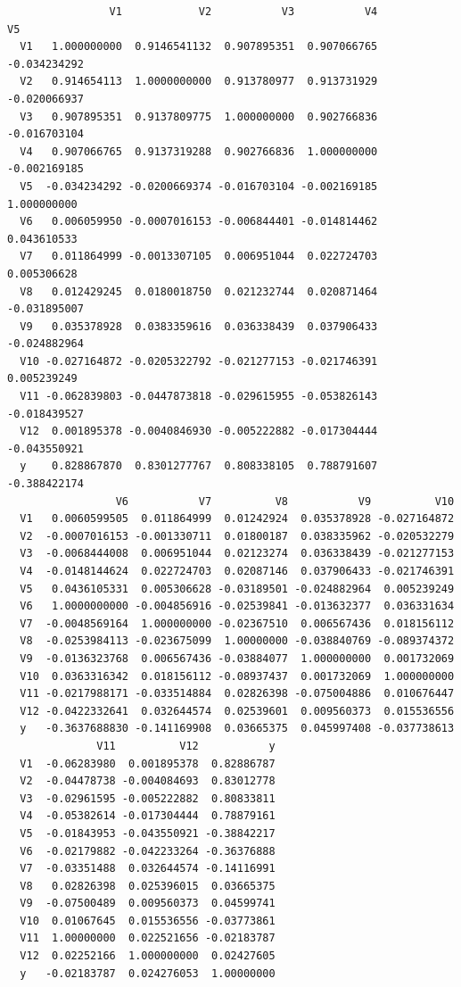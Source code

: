 \documentclass[12pt,twoside]{reedthesis}
\begin{document}
  \begin{verbatim}
                V1            V2           V3           V4           V5
  V1   1.000000000  0.9146541132  0.907895351  0.907066765 -0.034234292
  V2   0.914654113  1.0000000000  0.913780977  0.913731929 -0.020066937
  V3   0.907895351  0.9137809775  1.000000000  0.902766836 -0.016703104
  V4   0.907066765  0.9137319288  0.902766836  1.000000000 -0.002169185
  V5  -0.034234292 -0.0200669374 -0.016703104 -0.002169185  1.000000000
  V6   0.006059950 -0.0007016153 -0.006844401 -0.014814462  0.043610533
  V7   0.011864999 -0.0013307105  0.006951044  0.022724703  0.005306628
  V8   0.012429245  0.0180018750  0.021232744  0.020871464 -0.031895007
  V9   0.035378928  0.0383359616  0.036338439  0.037906433 -0.024882964
  V10 -0.027164872 -0.0205322792 -0.021277153 -0.021746391  0.005239249
  V11 -0.062839803 -0.0447873818 -0.029615955 -0.053826143 -0.018439527
  V12  0.001895378 -0.0040846930 -0.005222882 -0.017304444 -0.043550921
  y    0.828867870  0.8301277767  0.808338105  0.788791607 -0.388422174
                 V6           V7          V8           V9          V10
  V1   0.0060599505  0.011864999  0.01242924  0.035378928 -0.027164872
  V2  -0.0007016153 -0.001330711  0.01800187  0.038335962 -0.020532279
  V3  -0.0068444008  0.006951044  0.02123274  0.036338439 -0.021277153
  V4  -0.0148144624  0.022724703  0.02087146  0.037906433 -0.021746391
  V5   0.0436105331  0.005306628 -0.03189501 -0.024882964  0.005239249
  V6   1.0000000000 -0.004856916 -0.02539841 -0.013632377  0.036331634
  V7  -0.0048569164  1.000000000 -0.02367510  0.006567436  0.018156112
  V8  -0.0253984113 -0.023675099  1.00000000 -0.038840769 -0.089374372
  V9  -0.0136323768  0.006567436 -0.03884077  1.000000000  0.001732069
  V10  0.0363316342  0.018156112 -0.08937437  0.001732069  1.000000000
  V11 -0.0217988171 -0.033514884  0.02826398 -0.075004886  0.010676447
  V12 -0.0422332641  0.032644574  0.02539601  0.009560373  0.015536556
  y   -0.3637688830 -0.141169908  0.03665375  0.045997408 -0.037738613
              V11          V12           y
  V1  -0.06283980  0.001895378  0.82886787
  V2  -0.04478738 -0.004084693  0.83012778
  V3  -0.02961595 -0.005222882  0.80833811
  V4  -0.05382614 -0.017304444  0.78879161
  V5  -0.01843953 -0.043550921 -0.38842217
  V6  -0.02179882 -0.042233264 -0.36376888
  V7  -0.03351488  0.032644574 -0.14116991
  V8   0.02826398  0.025396015  0.03665375
  V9  -0.07500489  0.009560373  0.04599741
  V10  0.01067645  0.015536556 -0.03773861
  V11  1.00000000  0.022521656 -0.02183787
  V12  0.02252166  1.000000000  0.02427605
  y   -0.02183787  0.024276053  1.00000000
  \end{verbatim}
  
\end{document}
